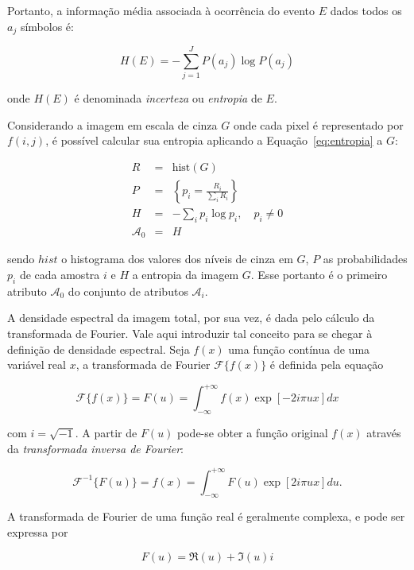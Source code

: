 Portanto, a informação média associada à ocorrência do evento $E$ dados todos os
$a_j$ símbolos é:

\begin{equation}
  H(E) =  -\sum_{j=1}^J P(a_j) \log P(a_j)
  \label{eq:entropia}
\end{equation} 

\noindent onde $H(E)$ é denominada \emph{incerteza} ou \emph{entropia} de $E$.

Considerando a imagem em escala de cinza $G$ onde cada pixel é representado por
$f(i,j)$, é possível calcular sua entropia aplicando a Equação~\ref{eq:entropia}
a $G$:

\begin{eqnarray}
  R & = & \text{hist}(G) \\
  P & = & \left\{ p_i = \frac{R_i}{\sum_{i} R_i} \right\}\\
  H & = & -\sum_i p_i \log p_i, \,\,\,\,\,\, p_i \neq 0 \\
  \mathcal{A}_0 & = & H
\end{eqnarray}

\noindent sendo $hist$ o histograma dos valores dos níveis de cinza em $G$, $P$
as probabilidades $p_i$ de cada amostra $i$ e $H$ a entropia da imagem $G$. Esse
portanto é o primeiro atributo $\mathcal{A}_0$ do conjunto de atributos
$\mathcal{A}_i$.

A densidade espectral da imagem total, por sua vez, é dada pelo cálculo da
transformada de Fourier. Vale aqui introduzir tal conceito para se chegar
à definição de densidade espectral. Seja $f(x)$ uma função contínua de uma
variável real $x$, a transformada de Fourier $\mathcal{F}\{f(x)\}$ é definida
pela equação

\begin{equation}
  \mathcal{F}\{f(x)\} = F(u) = \int_{-\infty}^{+\infty} f(x) \exp[-2i\pi u x] dx
\end{equation}

\noindent com $i = \sqrt{-1}$. A partir de $F(u)$ pode-se obter a função
original $f(x)$ através da \emph{transformada inversa de Fourier}:

\begin{equation}
  \mathcal{F}^{-1}\{F(u)\} = f(x) = \int_{-\infty}^{+\infty} F(u) \exp[2i\pi u x] du.
\end{equation}

A transformada de Fourier de uma função real é geralmente complexa, e pode ser
expressa por

\begin{equation}
  F(u) = \Re(u) + \Im(u)i
  \label{eq:fourier_complexa}
\end{equation}

